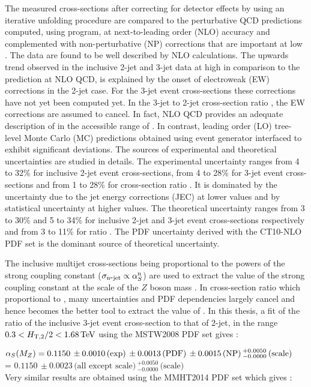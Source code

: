 The measured cross-sections after correcting for detector effects by using an iterative unfolding procedure are compared to the perturbative QCD predictions computed, using \NLOJETPP program, at next-to-leading order (NLO) accuracy and complemented with non-perturbative (NP) corrections that are important at low \httwo. The data are found to be well described by NLO calculations. The upwards trend observed in the inclusive 2-jet and 3-jet data at high \httwo in comparison to the prediction at NLO QCD, is explained by the onset of electroweak (EW) corrections in the 2-jet case. For the 3-jet event cross-sections these corrections have not yet been computed yet. In the 3-jet to 2-jet cross-section ratio \ratio, the EW corrections are assumed to cancel. In fact, NLO QCD provides an adequate description of \ratio in the accessible range of \httwo. In contrast, leading order (LO) tree-level Monte Carlo (MC) predictions obtained using \MadGraphF event generator interfaced to \PYTHIAS exhibit significant deviations. The sources of experimental and theoretical uncertainties are studied in details. The experimental uncertainty ranges from 4 to 32\% for inclusive 2-jet event cross-sections, from 4 to 28\% for 3-jet event cross-sections and from 1 to 28\% for cross-section ratio \ratio. It is dominated by the uncertainty due to the jet energy corrections (JEC) at lower \httwo values and by statistical uncertainty at higher \httwo values. The theoretical uncertainty ranges from 3 to 30\% and 5 to 34\% for inclusive 2-jet and 3-jet event cross-sections respectively and from 3 to 11\% for ratio \ratio. The PDF uncertainty derived with the CT10-NLO PDF set is the dominant source of theoretical uncertainty.

The inclusive multijet cross-sections being proportional to the powers of the strong coupling constant \alps ($\sigma_{\rm n\mbox{-} jet} \propto\alpha_S^{\rm n}$) are used to extract the value of the strong coupling constant at the scale of the $Z$ boson mass \alpsmz. In cross-section ratio \ratio which proportional to \alps, many uncertainties and PDF dependencies largely cancel and hence becomes the better tool to extract the value of \alpsmz. In this thesis, a fit of the ratio of the inclusive 3-jet event cross-section to that of 2-jet, \ratio in the range $0.3 < H_{\mathrm{T,2}}/2 < 1.68\,\text{Te\hspace{-.08em}V}$ using the MSTW2008 PDF set gives : 

$\alpha_S(M_Z) = 0.1150\,\pm0.0010\,\textrm{(exp)}\,\pm0.0013\,\textrm{(PDF)}\,\pm0.0015\,\textrm{(NP)}\,^{+0.0050}_{-0.0000}\,\textrm{(scale)}$ \\ \hspace*{24mm} = $0.1150\,\pm0.0023\,\textrm{(all except scale)}\,^{+0.0050}_{-0.0000}\,\textrm{(scale)}$ \\
Very similar results are obtained using the MMHT2014 PDF set which gives : 


